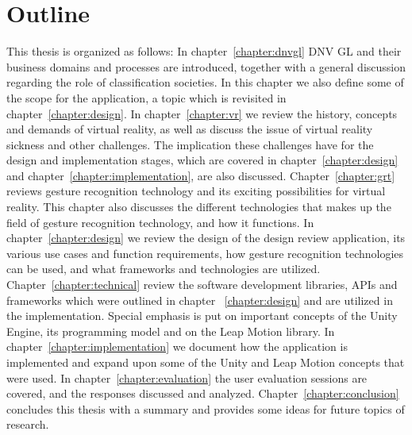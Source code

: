 \section{Outline}
This thesis is organized as follows: In chapter~\ref{chapter:dnvgl} DNV GL and their business domains and processes are introduced, together with a general discussion regarding
the role of classification societies. In this chapter we also define some of the scope for the application, a topic which is revisited in 
chapter~\ref{chapter:design}. In chapter~\ref{chapter:vr} we review the history, concepts and demands of virtual reality, as well as discuss the issue of virtual reality
sickness and other challenges. The implication these challenges have for the design and implementation stages, which are covered in chapter~\ref{chapter:design} and
chapter~\ref{chapter:implementation}, are also discussed. Chapter~\ref{chapter:grt} reviews gesture recognition technology and its exciting possibilities for virtual reality.
This chapter also discusses the different technologies that makes up the field of gesture recognition technology, and how it functions. 
In chapter~\ref{chapter:design} we review the design of the design review application, its various use cases and function requirements, how gesture recognition technologies
can be used, and what frameworks and technologies are utilized. Chapter~\ref{chapter:technical} review the software development libraries, APIs and frameworks
which were outlined in chapter ~\ref{chapter:design} and are utilized in the implementation. Special emphasis is put on important concepts of the Unity Engine, its programming model
and on the Leap Motion library.  
In chapter~\ref{chapter:implementation} we document how the application is implemented and expand upon some of the Unity and Leap Motion concepts that were used.
In chapter~\ref{chapter:evaluation} the user evaluation sessions are covered, and the responses discussed and analyzed.
Chapter~\ref{chapter:conclusion} concludes this thesis with a summary and provides some ideas for future topics of research.


